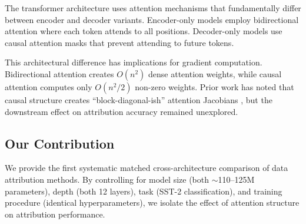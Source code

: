 The transformer architecture \citep{vaswani2017attention} uses attention mechanisms that fundamentally differ between encoder and decoder variants. Encoder-only models \citep{devlin2019bert} employ bidirectional attention where each token attends to all positions. Decoder-only models \citep{radford2019language} use causal attention masks that prevent attending to future tokens.

This architectural difference has implications for gradient computation. Bidirectional attention creates $O(n^2)$ dense attention weights, while causal attention computes only $O(n^2/2)$ non-zero weights. Prior work has noted that causal structure creates ``block-diagonal-ish'' attention Jacobians \citep{grosse2023studying}, but the downstream effect on attribution accuracy remained unexplored.

\subsection{Our Contribution}

We provide the first systematic matched cross-architecture comparison of data attribution methods. By controlling for model size (both $\sim$110--125M parameters), depth (both 12 layers), task (SST-2 classification), and training procedure (identical hyperparameters), we isolate the effect of attention structure on attribution performance.

